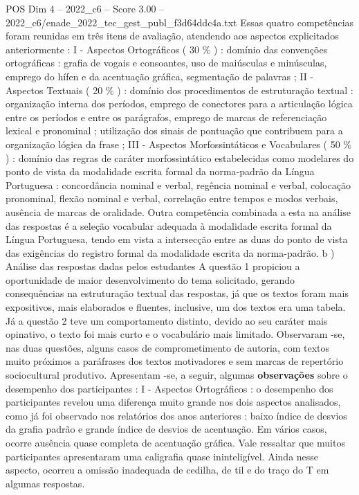 \begin{textsample}{POS Dim 4 – 2022\_c6 – Score 3.00 – 2022\_c6/enade\_2022\_tec\_gest\_publ\_f3d64ddc4a.txt}
Essas quatro competências foram reunidas em três itens de avaliação, atendendo aos aspectos explicitados anteriormente : I - Aspectos Ortográficos ( 30 \% ) : domínio das convenções ortográficas : grafia de vogais e consoantes, uso de maiúsculas e minúsculas, emprego do hífen e da acentuação gráfica, segmentação de palavras ; II - Aspectos Textuais ( 20 \% ) : domínio dos procedimentos de estruturação textual : organização interna dos períodos, emprego de conectores para a articulação lógica entre os períodos e entre os parágrafos, emprego de marcas de referenciação lexical e pronominal ; utilização dos sinais de pontuação que contribuem para a organização lógica da frase ; III - Aspectos Morfossintáticos e Vocabulares ( 50 \% ) : domínio das regras de caráter morfossintático estabelecidas como modelares do ponto de vista da modalidade escrita formal da norma-padrão da Língua Portuguesa : concordância nominal e verbal, regência nominal e verbal, colocação pronominal, flexão nominal e verbal, correlação entre tempos e modos verbais, ausência de marcas de oralidade.
Outra competência combinada a esta na análise das respostas é a seleção vocabular adequada à modalidade escrita formal da Língua Portuguesa, tendo em vista a intersecção entre as duas do ponto de vista das exigências do registro formal da modalidade escrita da norma-padrão. b ) Análise das respostas dadas pelos estudantes A questão 1 propiciou a oportunidade de maior desenvolvimento do tema solicitado, gerando consequências na estruturação textual das respostas, já que os textos foram mais expositivos, mais elaborados e fluentes, inclusive, um dos textos era uma tabela.
Já a questão 2 teve um comportamento distinto, devido ao seu caráter mais opinativo, o texto foi mais curto e o vocabulário mais limitado.
Observaram -se, nas duas questões, alguns casos de comprometimento de autoria, com textos muito próximos a paráfrases dos textos motivadores e sem marcas de repertório sociocultural produtivo.
Apresentam -se, a seguir, algumas \textbf{observações} sobre o desempenho dos participantes : I - Aspectos Ortográficos : o desempenho dos participantes revelou uma diferença muito grande nos dois aspectos analisados, como já foi observado nos relatórios dos anos anteriores : baixo índice de desvios da grafia padrão e grande índice de desvios de acentuação.
Em vários casos, ocorre ausência quase completa de acentuação gráfica.
Vale ressaltar que muitos participantes apresentaram uma caligrafia quase ininteligível.
Ainda nesse aspecto, ocorreu a omissão inadequada de cedilha, de til e do traço do T em algumas respostas.

\end{textsample}
